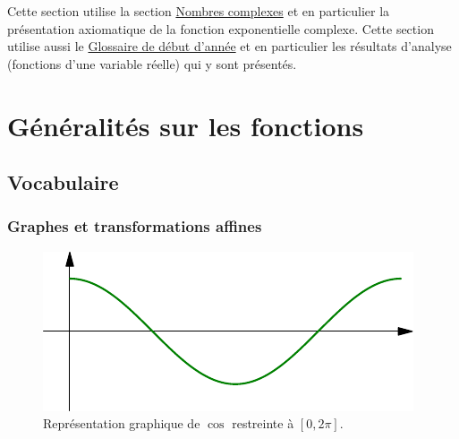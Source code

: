 

Cette section utilise la section \href{\baseurl C2002.pdf}{Nombres complexes} et en particulier la présentation axiomatique de la fonction exponentielle complexe. Cette section utilise aussi le \href{\baseurl C4199.pdf}{Glossaire de début d'année} et en particulier les résultats d'analyse (fonctions d'une variable réelle) qui y sont présentés.

\section{Généralités sur les fonctions}
\subsection{Vocabulaire}
\subsubsection{Graphes et transformations affines}
\begin{figure}[h]
 \centering
 \includegraphics{./C2004_7.pdf}
 \caption{Représentation graphique de $\cos$ restreinte à $\left[0 , 2\pi \right]$.}
 \label{fig:graph1}
\end{figure}

